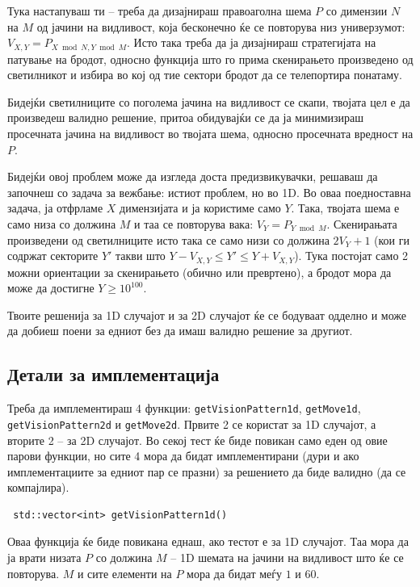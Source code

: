 \documentclass[12pt]{article}
\begin{document}
Тука настапуваш ти -- треба да дизајнираш правоаголна шема $P$ со димензии $N$ на $M$ од јачини на видливост, која бесконечно ќе се повторува низ универзумот: $V_{X, Y} = P_{X \bmod N, Y \bmod M}$. Исто така треба да ја дизајнираш стратегијата на патување на бродот, односно функција што го прима скенирањето произведено од светилникот и избира во кој од тие сектори бродот да се телепортира понатаму.

Бидејќи светилниците со поголема јачина на видливост се скапи, твојата цел е да произведеш валидно решение, притоа обидувајќи се да ја минимизираш просечната јачина на видливост во твојата шема, односно просечната вредност на $P$.

Бидејќи овој проблем може да изгледа доста предизвикувачки, решаваш да започнеш со задача за вежбање: истиот проблем, но во 1D. Во оваа поедноставна задача, ја отфрламе $X$ димензијата и ја користиме само $Y$. Така, твојата шема е само низа со должина $M$ и таа се повторува вака: $V_Y = P_{Y \bmod M}$. Скенирањата произведени од светилниците исто така се само низи со должина $2V_Y + 1$ (кои ги содржат секторите $Y'$ такви што  $Y - V_{X, Y} \leq Y' \leq Y + V_{X, Y}$). Тука постојат само 2 можни ориентации за скенирањето (обично или превртено), а бродот мора да може да достигне $Y \geq 10^{100}$.

Твоите решенија за 1D случајот и за 2D случајот ќе се бодуваат одделно и може да добиеш поени за едниот без да имаш валидно решение за другиот.

\subsection{Детали за имплементација}

Треба да имплементираш 4 функции: \verb|getVisionPattern1d|, \verb|getMove1d|, \verb|getVisionPattern2d| и \verb|getMove2d|. Првите 2 се користат за 1D случајот, а вторите 2 -- за 2D случајот. Во секој тест ќе биде повикан само еден од овие парови функции, но сите 4 мора да бидат имплементирани (дури и ако имплементациите за едниот пар се празни) за решението да биде валидно (да се компајлира).

\begin{lstlisting}
 std::vector<int> getVisionPattern1d()
\end{lstlisting}

Оваа функција ќе биде повикана еднаш, ако тестот е за 1D случајот. Таа мора да ја врати низата $P$ со должина $M$ -- 1D шемата на јачини на видливост што ќе се повторува. $M$ и сите елементи на $P$ мора да бидат меѓу $1$ и $60$.
\end{document}
